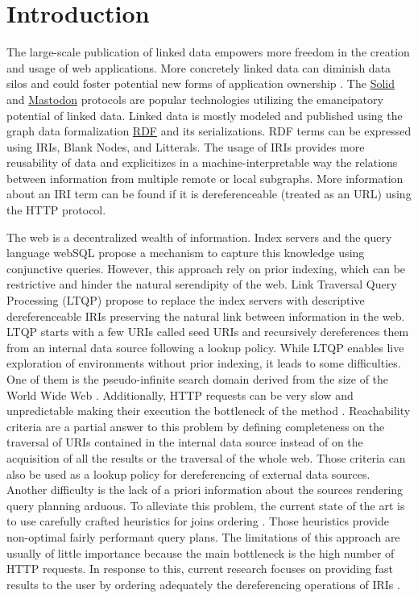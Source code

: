 \section{Introduction}
 
The large-scale publication of linked data empowers more freedom in the creation and usage of web applications.
More concretely linked data can diminish data silos \cite{Verstraete2022}
and could foster potential new forms of application ownership \cite{Mechant2021}.
The \href{https://solidproject.org/TR/protocol}{Solid} and
\href{https://docs.joinmastodon.org/}{Mastodon} protocols
are popular technologies utilizing the emancipatory potential of linked data.
Linked data is mostly modeled and published using the graph data formalization \href{https://www.w3.org/TR/rdf12-concepts/}{RDF} and its serializations.
RDF terms can be expressed using IRIs, Blank Nodes, and Litterals.
The usage of IRIs provides more reusability of data and explicitizes in a machine-interpretable way the relations between
information from multiple remote or local subgraphs.
More information about an IRI term can be found if it is dereferenceable (treated as an URL) using the HTTP protocol.


The web is a decentralized wealth of information.
Index servers and the query language webSQL \cite{Mendelzon1996} propose a mechanism to capture this knowledge using conjunctive queries.
However, this approach rely on prior indexing, which can be restrictive and hinder the natural serendipity of the web. 
Link Traversal Query Processing (LTQP) \cite{Hartig2012} propose to replace the index servers with descriptive dereferenceable IRIs 
preserving the natural link between information in the web.
LTQP starts with a few URIs called seed URIs and recursively dereferences them from an internal data source following a lookup policy.
While LTQP enables live exploration of environments without prior indexing, it leads to some difficulties.
One of them is the pseudo-infinite search domain derived from the size of the World Wide Web \cite{Hartig2014}.
Additionally, HTTP requests can be very slow and unpredictable making their execution the bottleneck of the method \cite{hartig2016walking}.
Reachability criteria \cite{Hartig2012} are a partial answer to this problem by defining completeness on the traversal of URIs
contained in the internal data source instead of on the acquisition of all the results or the traversal of the whole web.
Those criteria can also be used as a lookup policy for dereferencing of external data sources.
Another difficulty is the lack of a priori information about the sources rendering query planning arduous.
To alleviate this problem, the current state of the art is to use carefully crafted heuristics for joins ordering \cite{Hartig2011}.
Those heuristics provide non-optimal fairly performant query plans.
The limitations of this approach are usually of little importance because the main bottleneck is the high number of HTTP requests.
In response to this, current research focuses on providing fast results to the user by ordering adequately the dereferencing operations of IRIs \cite{hartig2016walking}.

